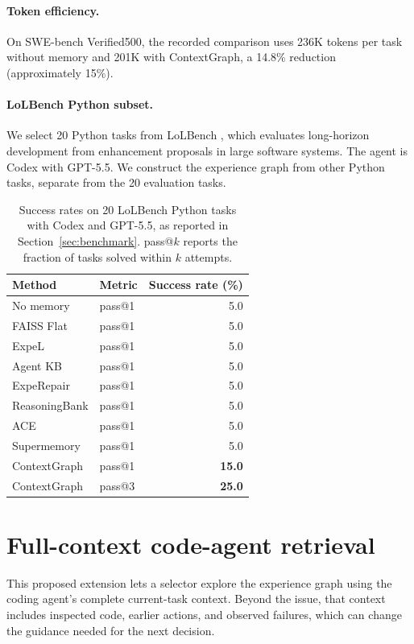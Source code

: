 \paragraph{Token efficiency.}
On SWE-bench Verified500, the recorded comparison uses 236K tokens per task
without memory and 201K with ContextGraph, a 14.8\% reduction
(approximately 15\%).

\paragraph{LoLBench Python subset.}
We select 20 Python tasks from LoLBench \citep{lolbench2026}, which evaluates
long-horizon development from enhancement proposals in large software
systems. The agent is Codex with GPT-5.5. We construct the experience graph
from other Python tasks, separate from the 20 evaluation tasks.

\begin{table}[htbp]
\centering
\caption{Success rates on 20 LoLBench Python tasks with Codex and GPT-5.5,
as reported in Section~\ref{sec:benchmark}.
pass@$k$ reports the fraction of tasks solved within $k$ attempts.}
\label{tab:new-codex55}
\begin{tabular}{llr}
\toprule
Method & Metric & Success rate (\%) \\
\midrule
No memory & pass@1 & 5.0 \\
FAISS Flat & pass@1 & 5.0 \\
ExpeL & pass@1 & 5.0 \\
Agent KB & pass@1 & 5.0 \\
ExpeRepair & pass@1 & 5.0 \\
ReasoningBank & pass@1 & 5.0 \\
ACE & pass@1 & 5.0 \\
Supermemory & pass@1 & 5.0 \\
ContextGraph & pass@1 & \textbf{15.0} \\
\midrule
ContextGraph & pass@3 & \textbf{25.0} \\
\bottomrule
\end{tabular}
\end{table}

\clearpage
\section{Full-context code-agent retrieval}
\label{sec:agentic-retrieval}
This proposed extension lets a selector explore the experience graph using
the coding agent's complete current-task context. Beyond the issue, that
context includes inspected code, earlier actions, and observed failures,
which can change the guidance needed for the next decision.

